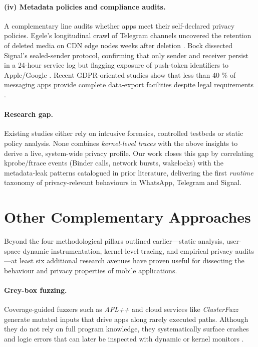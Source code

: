 \documentclass[a4paper,12pt]{report}
\begin{document}
\paragraph{(iv) Metadata policies and compliance audits.}
A complementary line audits whether apps meet their self-declared privacy
policies.  Egele’s longitudinal crawl of Telegram channels uncovered the
retention of deleted media on CDN edge nodes weeks after deletion
\cite{egele2019cdn}.
Bock dissected Signal’s sealed-sender protocol, confirming that only
sender and receiver persist in a 24-hour service log but flagging
exposure of push-token identifiers to Apple/Google \cite{bock2020sealed}.
Recent GDPR-oriented studies show that less than 40 \% of messaging apps
provide complete data-export facilities despite legal requirements
\cite{frolov2022gdpr}.

\paragraph{Research gap.}
Existing studies either rely on intrusive forensics, controlled testbeds
or static policy analysis.  None combines \emph{kernel-level traces} with
the above insights to derive a live, system-wide privacy profile.
Our work closes this gap by correlating kprobe/ftrace events
(Binder calls, network bursts, wakelocks) with the metadata-leak patterns
catalogued in prior literature, delivering the first \emph{runtime}
taxonomy of privacy-relevant behaviours in WhatsApp, Telegram and Signal.


\section*{Other Complementary Approaches}\label{sec:rw:other}

Beyond the four methodological pillars outlined earlier—static analysis, user-space dynamic instrumentation, kernel-level tracing, and empirical privacy audits—at least six additional research avenues have proven useful for dissecting the behaviour and privacy properties of mobile applications.

\paragraph{Grey-box fuzzing.}  Coverage-guided fuzzers such as \emph{AFL++} and cloud services like \emph{ClusterFuzz} generate mutated inputs that drive apps along rarely executed paths.  Although they do not rely on full program knowledge, they systematically surface crashes and logic errors that can later be inspected with dynamic or kernel monitors \cite{aflpp2023,clusterfuzz2020}.
\end{document}
